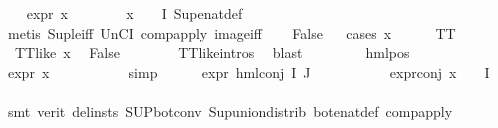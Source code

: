 \begin{isabellebody}
\ \ \isamarkupfalse%
\ {\isachardoublequoteopen}expr{\isacharunderscore}{\kern0pt}{}\ x\ {\isasymle}\ {}{\isachardoublequoteclose}\isanewline
\ \ \ \ \isamarkupfalse%
\ {\isacartoucheopen}x\ {\isasymin}\ {\isacharparenleft}{\kern0pt}{\isasymPhi}\ {\isacharbackquote}{\kern0pt}\ I{\isacharparenright}{\kern0pt}{\isacartoucheclose}\ Sup{\isacharunderscore}{\kern0pt}enat{\isacharunderscore}{\kern0pt}def\isanewline
\ \ \ \ \isamarkupfalse%
\ {\isacharparenleft}{\kern0pt}metis\ Sup{\isacharunderscore}{\kern0pt}le{\isacharunderscore}{\kern0pt}iff\ UnCI\ comp{\isacharunderscore}{\kern0pt}apply\ image{\isacharunderscore}{\kern0pt}iff{\isacharparenright}{\kern0pt}\isanewline
\ \ \isamarkupfalse%
\ False\isanewline
\ \ \isamarkupfalse%
{\isacharparenleft}{\kern0pt}cases\ x{\isacharparenright}{\kern0pt}\isanewline
\ \ \ \ \isamarkupfalse%
\ TT\isanewline
\ \ \ \ \isamarkupfalse%
\ {\isacartoucheopen}{\isasymnot}\ TT{\isacharunderscore}{\kern0pt}like\ x{\isacartoucheclose}\ \isamarkupfalse%
\ False\isanewline
\ \ \ \ \ \ \isamarkupfalse%
\ TT{\isacharunderscore}{\kern0pt}like{\isachardot}{\kern0pt}intros{\isacharparenleft}{\kern0pt}{}{\isacharparenright}{\kern0pt}\ \isamarkupfalse%
\ blast\isanewline
\ \ \isamarkupfalse%
\isanewline
\ \ \ \ \isamarkupfalse%
\ {\isacharparenleft}{\kern0pt}hml{\isacharunderscore}{\kern0pt}pos\ {\isasymalpha}\ {\isasymphi}{\isacharparenright}{\kern0pt}\isanewline
\ \ \ \ \isamarkupfalse%
\ {\isachardoublequoteopen}expr{\isacharunderscore}{\kern0pt}{}\ x\ {\isasymge}\ {}{\isachardoublequoteclose}\ \isanewline
\ \ \ \ \ \ \isamarkupfalse%
\ simp\isanewline
\ \ \ \ \isamarkupfalse%
\ {\isachardoublequoteopen}expr{\isacharunderscore}{\kern0pt}{}\ {\isacharparenleft}{\kern0pt}hml{\isacharunderscore}{\kern0pt}conj\ I\ J\ {\isasymPhi}{\isacharparenright}{\kern0pt}\ {\isasymge}\ {}{\isachardoublequoteclose}\isanewline
\ \ \ \ \ \ \isamarkupfalse%
\ expr{\isacharunderscore}{\kern0pt}{}{\isacharunderscore}{\kern0pt}conj\ {\isacartoucheopen}x\ {\isasymin}\ {\isasymPhi}\ {\isacharbackquote}{\kern0pt}\ I{\isacartoucheclose}\isanewline
\ \ \ \ \ \ \isamarkupfalse%
\ {\isacharparenleft}{\kern0pt}smt\ {\isacharparenleft}{\kern0pt}verit{\isacharcomma}{\kern0pt}\ del{\isacharunderscore}{\kern0pt}insts{\isacharparenright}{\kern0pt}\ SUP{\isacharunderscore}{\kern0pt}bot{\isacharunderscore}{\kern0pt}conv{\isacharparenleft}{\kern0pt}{}{\isacharparenright}{\kern0pt}\ Sup{\isacharunderscore}{\kern0pt}union{\isacharunderscore}{\kern0pt}distrib\ bot{\isacharunderscore}{\kern0pt}enat{\isacharunderscore}{\kern0pt}def\ comp{\isacharunderscore}{\kern0pt}apply\ \isanewline

\end{isabellebody}
